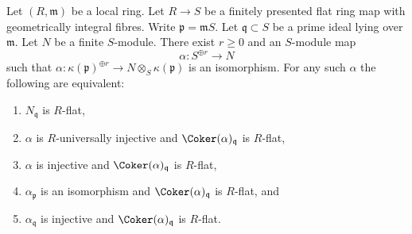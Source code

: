 \begin{lemma}
\label{lemma-induction-step}
Let $(R, \mathfrak m)$ be a local ring. Let $R \to S$ be a finitely presented
flat ring map with geometrically integral fibres. Write
$\mathfrak p = \mathfrak mS$. Let $\mathfrak q \subset S$ be a prime ideal
lying over $\mathfrak m$. Let $N$ be a finite $S$-module.
There exist $r \geq 0$ and an $S$-module map
$$
\alpha : S^{\oplus r} \longrightarrow N
$$
such that
$\alpha : \kappa(\mathfrak p)^{\oplus r} \to N \otimes_S \kappa(\mathfrak p)$
is an isomorphism. For any such $\alpha$ the following are equivalent:
\begin{enumerate}
\item $N_{\mathfrak q}$ is $R$-flat,
\item $\alpha$ is $R$-universally injective and
$\Coker(\alpha)_{\mathfrak q}$ is $R$-flat,
\item $\alpha$ is injective and
$\Coker(\alpha)_{\mathfrak q}$ is $R$-flat,
\item $\alpha_{\mathfrak p}$ is an isomorphism and
$\Coker(\alpha)_{\mathfrak q}$ is $R$-flat, and
\item $\alpha_{\mathfrak q}$ is injective and
$\Coker(\alpha)_{\mathfrak q}$ is $R$-flat.
\end{enumerate}
\end{lemma}

